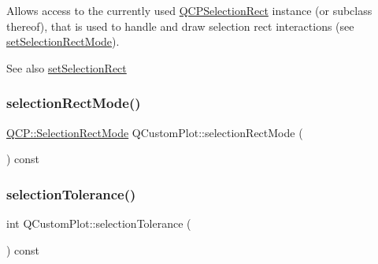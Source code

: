 Allows access to the currently used \mbox{\hyperlink{class_q_c_p_selection_rect}{Q\+C\+P\+Selection\+Rect}} instance (or subclass thereof), that is used to handle and draw selection rect interactions (see \mbox{\hyperlink{class_q_custom_plot_a810ef958ebe84db661c7288b526c0deb}{set\+Selection\+Rect\+Mode}}).

\begin{DoxySeeAlso}{See also}
\mbox{\hyperlink{class_q_custom_plot_a0c09f96df15faa4799ad7051bb16cf33}{set\+Selection\+Rect}} 
\end{DoxySeeAlso}
\mbox{\label{class_q_custom_plot_a6e53c402de2770a978dffa5584c05b27}} 
\subsubsection{\texorpdfstring{selectionRectMode()}{selectionRectMode()}}
{\footnotesize\ttfamily \mbox{\hyperlink{namespace_q_c_p_ac9aa4d6d81ac76b094f9af9ad2d3aacf}{Q\+C\+P\+::\+Selection\+Rect\+Mode}} Q\+Custom\+Plot\+::selection\+Rect\+Mode (\begin{DoxyParamCaption}{ }\end{DoxyParamCaption}) const\hspace{0.3cm}{\ttfamily [inline]}}

\mbox{\label{class_q_custom_plot_a5441d11013afeaf4b8f2ea06e8624a25}} 
\subsubsection{\texorpdfstring{selectionTolerance()}{selectionTolerance()}}
{\footnotesize\ttfamily int Q\+Custom\+Plot\+::selection\+Tolerance (\begin{DoxyParamCaption}{ }\end{DoxyParamCaption}) const\hspace{0.3cm}{\ttfamily [inline]}}

\mbox{\label{class_q_custom_plot_aeef813bcf7efab8e765f9f87ec454691}} 
